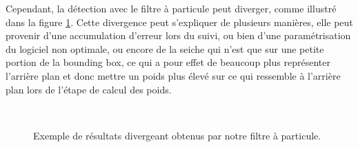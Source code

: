 Cependant, la détection avec le filtre à particule peut diverger, comme illustré dans la figure \ref{fig:pf_diverg_results}. Cette divergence peut s'expliquer de plusieurs manières, elle peut provenir d'une accumulation d'erreur lors du suivi, ou bien d'une paramétrisation du logiciel non optimale, ou encore de la seiche qui n'est que sur une petite portion de la bounding box, ce qui a pour effet de beaucoup plus représenter l'arrière plan et donc mettre un poids plus élevé sur ce qui ressemble à l'arrière plan lors de l'étape de calcul des poids.

\begin{figure}[!htbp]
\center
	\hspace{0.1cm}
	\\
	\hspace{0.1cm}
\caption{Exemple de résultats divergeant obtenus par notre filtre à particule.}
\label{fig:pf_diverg_results}
\end{figure}
\FloatBarrier

\clearpage